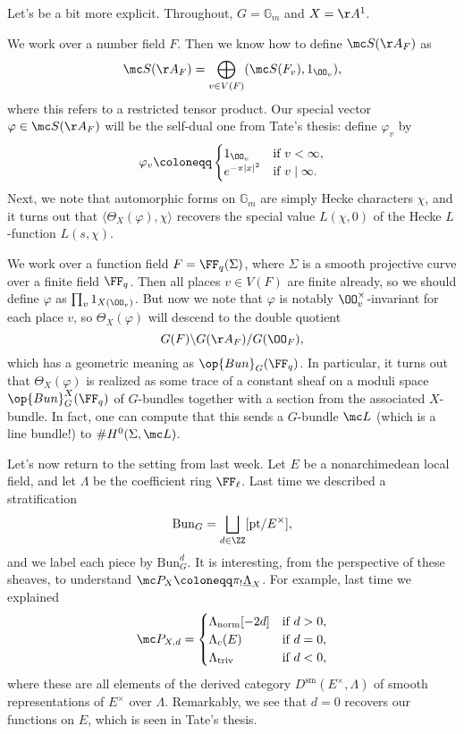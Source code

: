 \documentclass{article}
\begin{document}
Let's be a bit more explicit. Throughout, $G=\mathbb G_m$ and $X=\AA^1$.
\begin{example}
	We work over a number field $F$. Then we know how to define $\mc S(\AA_F)$ as
	\[\mc S(\AA_F)=\bigoplus_{v\in V(F)}(\mc S(F_v),1_{\OO_v}),\]
	where this refers to a restricted tensor product. Our special vector $\varphi\in\mc S(\AA_F)$ will be the self-dual one from Tate's thesis: define $\varphi_v$ by
	\[\varphi_v\coloneqq\begin{cases}
		1_{\OO_v} & \text{if }v<\infty, \\
		e^{-\pi\left|x\right|^2} & \text{if }v\mid\infty.
	\end{cases}\]
	Next, we note that automorphic forms on $\mathbb G_m$ are simply Hecke characters $\chi$, and it turns out that $\langle\Theta_X(\varphi),\chi\rangle$ recovers the special value $L(\chi,0)$ of the Hecke $L$-function $L(s,\chi)$.
\end{example}
\begin{example}
	We work over a function field $F=\FF_q(\Sigma)$, where $\Sigma$ is a smooth projective curve over a finite field $\FF_q$. Then all places $v\in V(F)$ are finite already, so we should define $\varphi$ as $\prod_v1_{X(\OO_v)}$. But now we note that $\varphi$ is notably $\OO_v^\times$-invariant for each place $v$, so $\Theta_X(\varphi)$ will descend to the double quotient
	\[G(F)\backslash G(\AA_F)/G(\OO_F),\]
	which has a geometric meaning as $\op{Bun}_G(\FF_q)$. In particular, it turns out that $\Theta_X(\varphi)$ is realized as some trace of a constant sheaf on a moduli space $\op{Bun}_G^X(\FF_q)$ of $G$-bundles together with a section from the associated $X$-bundle. In fact, one can compute that this sends a $G$-bundle $\mc L$ (which is a line bundle!) to $\#H^0(\Sigma,\mc L)$.
\end{example}
Let's now return to the setting from last week. Let $E$ be a nonarchimedean local field, and let $\Lambda$ be the coefficient ring $\FF_\ell$. Last time we described a stratification
\[\mathrm{Bun}_G=\bigsqcup_{d\in\ZZ}[\mathrm{pt}/E^\times],\]
and we label each piece by $\mathrm{Bun}_G^d$. It is interesting, from the perspective of these sheaves, to understand $\mc P_X\coloneqq\pi_!\underline\Lambda_X$. For example, last time we explained
\[\mc P_{X,d}=\begin{cases}
	\Lambda_{\mathrm{norm}}[-2d] & \text{if }d>0, \\
	\Lambda_c(E) & \text{if }d=0, \\
	\Lambda_{\mathrm{triv}} & \text{if }d<0,
\end{cases}\]
where these are all elements of the derived category $D^{\mathrm{sm}}(E^\times,\Lambda)$ of smooth representations of $E^\times$ over $\Lambda$. Remarkably, we see that $d=0$ recovers our functions on $E$, which is seen in Tate's thesis.
\end{document}
